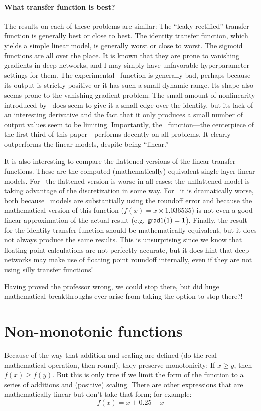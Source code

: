 \documentclass[twocolumn]{article}
\begin{document}
\paragraph{What transfer function is best?}
The results on each of these problems are similar: The ``leaky
rectified'' transfer function is generally best or close to best. The
identity transfer function, which yields a simple linear model, is
generally worst or close to worst. The sigmoid functions are all over
the place. It is known that they are prone to vanishing gradients in
deep networks, and I may simply have unfavorable hyperparameter
settings for them. The experimental \downshifttwo\ function is
generally bad, perhaps because its output is strictly positive or it
has such a small dynamic range. Its shape also seems prone to the
vanishing gradient problem. The small amount of nonlinearity
introduced by \plussixtyfour\ does seem to give it a small edge over
the identity, but its lack of an interesting derivative and the fact
that it only produces a small number of output values seem to be
limiting. Importantly, the \gradone\ function---the centerpiece of the
first third of this paper---performs decently on all problems. It
clearly outperforms the linear models, despite being ``linear.''

It is also interesting to compare the flattened versions of the linear
transfer functions. These are the computed (mathematically) equivalent
single-layer linear models. For \plussixtyfour\ the flattened version
is worse in all cases; the unflattened model is taking advantage of
the discretization in some way. For \gradone\ it is dramatically
worse, both because \gradone\ models are substantially using the
roundoff error and because the mathematical version of this function
($f(x) = x \times 1.036535$) is not even a good linear approximation
of the actual result (e.g. ${\sf grad1}(1) = 1$). Finally, the result
for the identity transfer function should be mathematically equivalent,
but it does not always produce the same results. This is unsurprising
since we know that floating point calculations are not perfectly
accurate, but it does hint that deep networks may make use of
floating point roundoff internally, even if they are not using silly
transfer functions!

\smallskip
Having proved the professor wrong, we could stop there, but did huge
mathematical breakthroughs ever arise from taking the option to stop
there?!


\section{Non-monotonic functions}
Because of the way that addition and scaling are defined (do the real
mathematical operation, then round), they preserve monotonicity: If $x
\geq y$, then $f(x) \geq f(y)$. But this is only true if we limit the
form of the function to a series of additions and (positive) scaling.
There are other expressions that are mathematically linear but don't
take that form; for example:
%
%
$$f(x) = x + 0.25 - x$$
\end{document}

